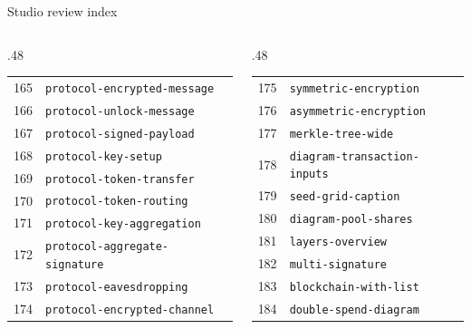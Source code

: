 \documentclass[aspectratio=169]{beamer}
\begin{document}
\begin{frame}{Studio review index}\fontsize{6.5}{9}\selectfont\begin{columns}[T]
\begin{column}{.48\textwidth}\begin{tabular}{rl}
165 & \texttt{protocol-encrypted-message} \\
166 & \texttt{protocol-unlock-message} \\
167 & \texttt{protocol-signed-payload} \\
168 & \texttt{protocol-key-setup} \\
169 & \texttt{protocol-token-transfer} \\
170 & \texttt{protocol-token-routing} \\
171 & \texttt{protocol-key-aggregation} \\
172 & \texttt{protocol-aggregate-signature} \\
173 & \texttt{protocol-eavesdropping} \\
174 & \texttt{protocol-encrypted-channel} \\
\end{tabular}\end{column}
\begin{column}{.48\textwidth}\begin{tabular}{rl}
175 & \texttt{symmetric-encryption} \\
176 & \texttt{asymmetric-encryption} \\
177 & \texttt{merkle-tree-wide} \\
178 & \texttt{diagram-transaction-inputs} \\
179 & \texttt{seed-grid-caption} \\
180 & \texttt{diagram-pool-shares} \\
181 & \texttt{layers-overview} \\
182 & \texttt{multi-signature} \\
183 & \texttt{blockchain-with-list} \\
184 & \texttt{double-spend-diagram} \\
\end{tabular}\end{column}
\end{columns}\end{frame}
\end{document}
